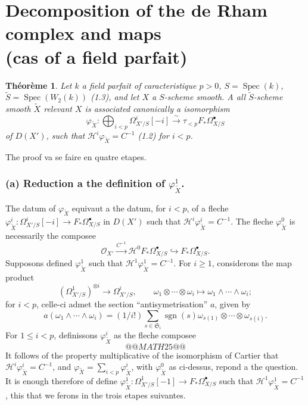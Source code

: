\documentclass[12pt,a4paper]{article}
\theoremstyle{plain}
\newtheorem{theorem}{Th\'eor\`eme}[section]
\theoremstyle{definition}
\theoremstyle{remark}
\DeclareMathOperator{\Spec}{Spec}
\DeclareMathOperator{\sgn}{sgn}
\newcommand{\cO}{\mathcal{O}}
\begin{document}
\section{Decomposition of the de Rham complex and maps\\(cas of a field parfait)}

\begin{theorem}\label{thm:2.1}
Let $k$ a field parfait of caracteristique $p>0$, $S = \Spec(k)$,
$\tilde{S} = \Spec(W_2(k))$ \textup{(1.3)}, and let $X$ a $S$-scheme smooth. A all $\tilde{S}$-scheme smooth $\tilde{X}$ relevant $X$
is associated canonically a isomorphism
\[
\varphi_{\tilde{X}}: \bigoplus_{i < p} \Omega^i_{X'/S}[-i] \xrightarrow{\sim} \tau_{<p} F_* \Omega^{\bullet}_{X/S}
\]
of $D(X')$, such that $\mathscr{H}^i \varphi_{\tilde{X}} = C^{-1}$ \textup{(1.2)} for $i < p$.
\end{theorem}

The proof va se faire en quatre etapes.

\subsubsection*{(a) Reduction a the definition of $\varphi^1_{\tilde{X}}$.}

The datum of $\varphi_{\tilde{X}}$ equivaut a the datum, for $i < p$, of a fleche $\varphi^i_{\tilde{X}}: \Omega^i_{X'/S}[-i] \to F_* \Omega^{\bullet}_{X/S}$ in $D(X')$ such that $\mathscr{H}^i \varphi^i_{\tilde{X}} = C^{-1}$. The fleche $\varphi^0_{\tilde{X}}$ is necessarily the composee
\[
\cO_{X'} \xrightarrow{C^{-1}} \mathscr{H}^0 F_* \Omega^{\bullet}_{X/S} \hookrightarrow F_* \Omega^{\bullet}_{X/S}.
\]
Supposons defined $\varphi^1_{\tilde{X}}$ such that $\mathscr{H}^1 \varphi^1_{\tilde{X}} = C^{-1}$. For $i \ge 1$, considerons the map product
\[
(\Omega^1_{X'/S})^{\otimes i} \to \Omega^i_{X'/S}, \qquad \omega_1 \otimes \cdots \otimes \omega_i \mapsto \omega_1 \wedge \cdots \wedge \omega_i;
\]
for $i < p$, celle-ci admet the section ``antisymetrisation'' $a$, given by
\[
a(\omega_1 \wedge \cdots \wedge \omega_i) = (1/i!) \sum_{s \in \mathfrak{S}_i} \sgn(s) \omega_{s(1)} \otimes \cdots \otimes \omega_{s(i)}.
\]
For $1 \le i < p$, definissons $\varphi^i_{\tilde{X}}$ as the fleche composee
\[
@@MATH25@@
\]
It follows of the property multiplicative of the isomorphism of Cartier that $\mathscr{H}^i \varphi^i_{\tilde{X}} = C^{-1}$, and $\varphi_{\tilde{X}} = \sum_{i < p} \varphi^i_{\tilde{X}}$, with $\varphi^0_{\tilde{X}}$ as ci-dessus, repond a the question. It is enough therefore of define $\varphi^1_{\tilde{X}}: \Omega^1_{X'/S}[-1] \to F_* \Omega^{\bullet}_{X/S}$ such that $\mathscr{H}^1 \varphi^1_{\tilde{X}} = C^{-1}$, this that we ferons in the trois etapes suivantes.
\end{document}
